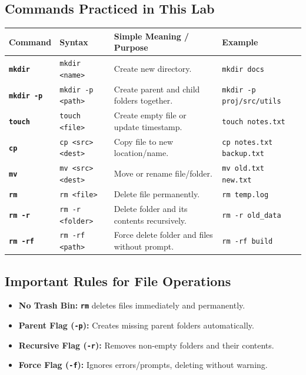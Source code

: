 \documentclass[10pt,a4paper]{article}
\newcommand{\cmd}[1]{\texttt{\textbf{#1}}}
\begin{document}
\subsection{Commands Practiced in This Lab}
\vspace{-2pt}
\begin{table}[h!]
\centering\footnotesize
\renewcommand{\arraystretch}{1.08}
\begin{tabularx}{\linewidth}{llp{5.5cm}X}
\toprule
\textbf{Command} & \textbf{Syntax} & \textbf{Simple Meaning / Purpose} & \textbf{Example} \\
\midrule
\cmd{mkdir} & \texttt{mkdir <name>} & Create new directory. & \texttt{mkdir docs} \\
\cmd{mkdir -p} & \texttt{mkdir -p <path>} & Create parent and child folders together. & \texttt{mkdir -p proj/src/utils} \\
\cmd{touch} & \texttt{touch <file>} & Create empty file or update timestamp. & \texttt{touch notes.txt} \\
\cmd{cp} & \texttt{cp <src> <dest>} & Copy file to new location/name. & \texttt{cp notes.txt backup.txt} \\
\cmd{mv} & \texttt{mv <src> <dest>} & Move or rename file/folder. & \texttt{mv old.txt new.txt} \\
\cmd{rm} & \texttt{rm <file>} & Delete file permanently. & \texttt{rm temp.log} \\
\cmd{rm -r} & \texttt{rm -r <folder>} & Delete folder and its contents recursively. & \texttt{rm -r old\_data} \\
\cmd{rm -rf} & \texttt{rm -rf <path>} & Force delete folder and files without prompt. & \texttt{rm -rf build} \\
\bottomrule
\end{tabularx}
\end{table}
\vspace{-6pt}

\subsection{Important Rules for File Operations}
\begin{itemize}[noitemsep,topsep=1pt,leftmargin=1.2em]
  \item \textbf{No Trash Bin:} \cmd{rm} deletes files immediately and permanently.
  \item \textbf{Parent Flag (\cmd{-p}):} Creates missing parent folders automatically.
  \item \textbf{Recursive Flag (\cmd{-r}):} Removes non-empty folders and their contents.
  \item \textbf{Force Flag (\cmd{-f}):} Ignores errors/prompts, deleting without warning.
\end{itemize}
\vspace{-6pt}
\end{document}
